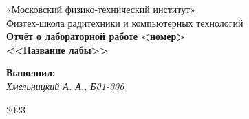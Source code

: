 
\pagecolor{default_color}


\pagecolor{white}
\pagestyle{fancy}
\fancyhf{}
\rfoot{}


\thispagestyle{empty}

\begin{center}
\large{«Московский физико-технический институт»} \\  
\large{Физтех-школа радитехники и компьютерных технологий }\\
\vspace*{6cm}
{\bfseries
    {\Huge Отчёт о лабораторной работе \textnumero <номер>  \\ <<Название лабы>>}
}
\end{center}

\vspace*{1cm}
\begin{flushright}
    \large{
    \textbf{Выполнил:} \\ \textit{ Хмельницкий А. А., Б01-306} \\
    }
\end{flushright}

\vspace*{11cm}
\begin{center}
2023
\end{center}

\newpage